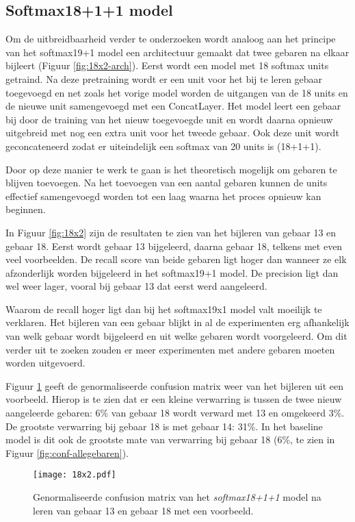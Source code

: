 \subsection{Softmax18+1+1 model}

Om de uitbreidbaarheid verder te onderzoeken wordt analoog aan het principe van het softmax19+1 model een architectuur gemaakt dat twee gebaren na elkaar bijleert (Figuur \ref{fig:18x2-arch}). Eerst wordt een model met 18 softmax units getraind. Na deze pretraining wordt er een unit voor het bij te leren gebaar toegevoegd en net zoals het vorige model worden de uitgangen van de 18 units en de nieuwe unit samengevoegd met een ConcatLayer.
\npar Het model leert een gebaar bij door de training van het nieuw toegevoegde unit en wordt daarna opnieuw uitgebreid met nog een extra unit voor het tweede gebaar. Ook deze unit wordt geconcateneerd zodat er uiteindelijk een softmax van 20 units is (18+1+1).

\npar Door op deze manier te werk te gaan is het theoretisch mogelijk om gebaren te blijven toevoegen. Na het toevoegen van een aantal gebaren kunnen de units effectief samengevoegd worden tot een laag waarna het proces opnieuw kan beginnen.

\npar In Figuur \ref{fig:18x2} zijn de resultaten te zien van het bijleren van gebaar 13 en gebaar 18. Eerst wordt gebaar 13 bijgeleerd, daarna gebaar 18, telkens met even veel voorbeelden. De recall score van beide gebaren ligt hoger dan wanneer ze elk afzonderlijk worden bijgeleerd in het softmax19+1 model. De precision ligt dan wel weer lager, vooral bij gebaar 13 dat eerst werd aangeleerd.

\npar Waarom de recall hoger ligt dan bij het softmax19x1 model valt moeilijk te verklaren. Het bijleren van een gebaar blijkt in al de experimenten erg afhankelijk van welk gebaar wordt bijgeleerd en uit welke gebaren wordt voorgeleerd. Om dit verder uit te zoeken zouden er meer experimenten met andere gebaren moeten worden uitgevoerd.

\npar Figuur \ref{fig:conf-18x2} geeft de genormaliseerde confusion matrix weer van het bijleren uit een voorbeeld. Hierop is te zien dat er een kleine verwarring is tussen de twee nieuw aangeleerde gebaren: 6\% van gebaar 18 wordt verward met 13 en omgekeerd 3\%. De grootste verwarring bij gebaar 18 is met gebaar 14: 31\%. In het baseline model is dit ook de grootste mate van verwarring bij gebaar 18 (6\%, te zien in Figuur \ref{fig:conf-allegebaren}).


\begin{figure}
	\centering
	\texttt{[image: 18x2.pdf]}
	\caption{Precision en recall na het bijleren van gebaar 13 en gebaar 18 in het \textit{softmax18+1+1} model. Ter vergelijking is het resultaat van het \textit{softmax19+1} model ook uitgetekend.}\label{fig:18x2}
	\vspace{1.5cm}
	\def\svgwidth{0.7\columnwidth}
	
	\caption{Genormaliseerde confusion matrix van het \textit{softmax18+1+1} model na leren van gebaar 13 en gebaar 18 met een voorbeeld.}\label{fig:conf-18x2}
\end{figure}